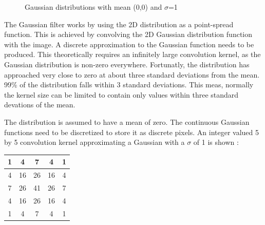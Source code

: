 \begin{figure}[H]
  \centering
  \hfill
  \caption{Gaussian distributions with mean (0,0) and $\sigma$=1\cite{GaussianBlur}}
\end{figure} 



The Gaussian filter works by using the 2D distribution as a point-spread function. This is achieved by convolving the 2D Gaussian distribution function with the image. A discrete approximation to the Gaussian function needs to be produced. This theoretically requires an infinitely large convolution kernel, as the Gaussian distribution is non-zero everywhere. Fortunatly, the distribution has approached very close to zero at about three standard deviations from the mean. 99\% of the distribution falls within 3 standard deviations. This meas, normally the kernel size can be limited to contain only values within three standard devations of the mean.

The distribution is assumed to have a mean of zero. The continuous Gaussian functions need to be discretized to store it as discrete pixels. An integer valued 5 by 5 convolution kernel approximating a Gaussian with a $ \sigma $ of 1 is shown : 




\begin{center}
\begin{tabular}{ | c | c | c | c | c |} \hline
  
  1 & 4  & 7  & 4  & 1  \\ \hline  
  4 & 16 & 26 & 16 & 4   \\ \hline  
  7 & 26 & 41 & 26 & 7   \\ \hline 
  4 & 16 & 26 & 16 & 4   \\ \hline 
  1 & 4  & 7  & 4  & 1  \\ \hline   
    
      \end{tabular}
  \label{tab:GaussianBlur}
\end{center}


